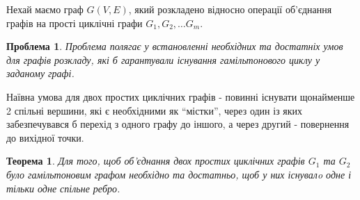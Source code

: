 \documentclass[a4paper,14pt,ukrainian]{extarticle}
\newtheorem{problem}{Проблема}
\newtheorem{theorem}{Теорема}
\begin{document}
    Нехай маємо граф $G(V,E)$, який розкладено відносно операції об’єднання графів на прості циклічні графи $G_1, G_2, \dots G_m$.
    \begin{problem}
        Проблема полягає у встановленні необхідних та достатніх умов для графів розкладу, які б гарантували існування гамільтонового циклу у заданому графі.
    \end{problem}
    Наївна умова для двох простих циклічних графів - повинні існувати щонайменше 2 спільні вершини, які є необхідними як ``містки'', через один із яких забезпечувався б перехід з одного графу до іншого, а через другий - повернення до вихідної точки.
    \begin{theorem}
    \label{JoinOfTwoCycleGraphs}
        Для того, щоб об’єднання двох простих циклічних графів $G_1$ та $G_2$ було гамільтоновим графом необхідно та достатньо, щоб у них існувалo одне і тільки одне спільне ребро.
    \end{theorem}
\end{document}
